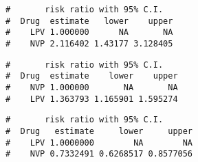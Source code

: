 \documentclass[letterpaper,12pt,twoside,]{pinp}
\begin{document}
\begin{Shaded}
\begin{Highlighting}[]
 \NormalTok{)}\OperatorTok{$}
\end{Highlighting}
\end{Shaded}

\begin{ShadedResult}
\begin{verbatim}
#       risk ratio with 95% C.I.
#  Drug  estimate   lower    upper
#    LPV 1.000000      NA       NA
#    NVP 2.116402 1.43177 3.128405
\end{verbatim}
\end{ShadedResult}

\begin{Shaded}
\begin{Highlighting}[]
 \NormalTok{)}\OperatorTok{$}
\end{Highlighting}
\end{Shaded}

\begin{ShadedResult}
\begin{verbatim}
#       risk ratio with 95% C.I.
#  Drug  estimate    lower    upper
#    NVP 1.000000       NA       NA
#    LPV 1.363793 1.165901 1.595274
\end{verbatim}
\end{ShadedResult}

\begin{Shaded}
\begin{Highlighting}[]
 \NormalTok{)}\OperatorTok{$}
\end{Highlighting}
\end{Shaded}

\begin{ShadedResult}
\begin{verbatim}
#       risk ratio with 95% C.I.
#  Drug   estimate     lower     upper
#    LPV 1.0000000        NA        NA
#    NVP 0.7332491 0.6268517 0.8577056
\end{verbatim}
\end{ShadedResult}
\end{document}
